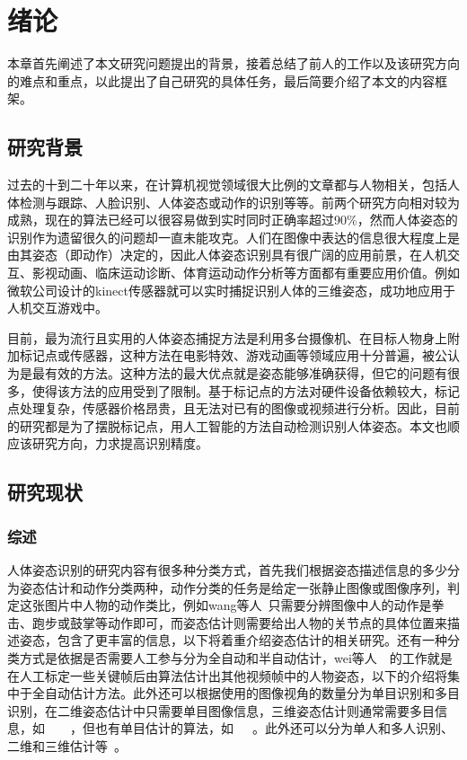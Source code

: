 


\chapter{绪论}
本章首先阐述了本文研究问题提出的背景，接着总结了前人的工作以及该研究方向的难点和重点，以此提出了自己研究的具体任务，最后简要介绍了本文的内容框架。

\section{研究背景}
过去的十到二十年以来，在计算机视觉领域很大比例的文章都与人物相关，包括人体检测与跟踪、人脸识别、人体姿态或动作的识别等等。前两个研究方向相对较为成熟，现在的算法已经可以很容易做到实时同时正确率超过90\%，然而人体姿态的识别作为遗留很久的问题却一直未能攻克。人们在图像中表达的信息很大程度上是由其姿态（即动作）决定的，因此人体姿态识别具有很广阔的应用前景，在人机交互、影视动画、临床运动诊断、体育运动动作分析等方面都有重要应用价值。例如微软公司设计的kinect传感器就可以实时捕捉识别人体的三维姿态，成功地应用于人机交互游戏中。

目前，最为流行且实用的人体姿态捕捉方法是利用多台摄像机、在目标人物身上附加标记点或传感器，这种方法在电影特效、游戏动画等领域应用十分普遍，被公认为是最有效的方法。这种方法的最大优点就是姿态能够准确获得，但它的问题有很多，使得该方法的应用受到了限制。基于标记点的方法对硬件设备依赖较大，标记点处理复杂，传感器价格昂贵，且无法对已有的图像或视频进行分析。因此，目前的研究都是为了摆脱标记点，用人工智能的方法自动检测识别人体姿态。本文也顺应该研究方向，力求提高识别精度。

\section{研究现状}
\subsection{综述}
人体姿态识别的研究内容有很多种分类方式，首先我们根据姿态描述信息的多少分为姿态估计和动作分类两种，动作分类的任务是给定一张静止图像或图像序列，判定这张图片中人物的动作类比，例如wang等人~\cite{wang2007semi}只需要分辨图像中人的动作是拳击、跑步或鼓掌等动作即可，而姿态估计则需要给出人物的关节点的具体位置来描述姿态，包含了更丰富的信息，以下将着重介绍姿态估计的相关研究。还有一种分类方式是依据是否需要人工参与分为全自动和半自动估计，wei等人~\cite{wei2009modeling}~\cite{wei2010videomocap}的工作就是在人工标定一些关键帧后由算法估计出其他视频帧中的人物姿态，以下的介绍将集中于全自动估计方法。此外还可以根据使用的图像视角的数量分为单目识别和多目识别，在二维姿态估计中只需要单目图像信息，三维姿态估计则通常需要多目信息，如~\cite{bo2008fast}~\cite{burenius20133d}~\cite{bo2010twin}~\cite{Poppe2007}，但也有单目估计的算法，如~\cite{wei2009modeling}~\cite{wei2010videomocap}~\cite{agarwal2006recovering}。此外还可以分为单人和多人识别、二维和三维估计等~\cite{moeslund2011visual}。

